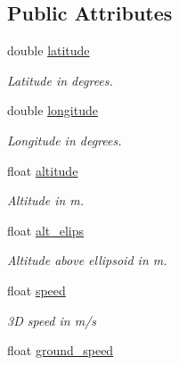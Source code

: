 \subsection*{Public Attributes}
\begin{DoxyCompactItemize}
\item 
double \hyperlink{structgps__t_af54fe11cbde7878a0727616f24dd8fc7}{latitude}
\begin{DoxyCompactList}\small\item\em Latitude in degrees. \end{DoxyCompactList}\item 
double \hyperlink{structgps__t_ad705360e2144f17add716374c5d0395f}{longitude}
\begin{DoxyCompactList}\small\item\em Longitude in degrees. \end{DoxyCompactList}\item 
float \hyperlink{structgps__t_a72edc614dd84ab0d29c6720d15d79e8e}{altitude}
\begin{DoxyCompactList}\small\item\em Altitude in m. \end{DoxyCompactList}\item 
float \hyperlink{structgps__t_a7ce84b87b2d3cbc7d6458e3734cc78e6}{alt\+\_\+elips}
\begin{DoxyCompactList}\small\item\em Altitude above ellipsoid in m. \end{DoxyCompactList}\item 
\hypertarget{structgps__t_a2300eed2c84ab00718f31350f87daa44}{float \hyperlink{structgps__t_a2300eed2c84ab00718f31350f87daa44}{speed}}\label{structgps__t_a2300eed2c84ab00718f31350f87daa44}

\begin{DoxyCompactList}\small\item\em 3\+D speed in m/s \end{DoxyCompactList}\item 
\hypertarget{structgps__t_af27678536c3e3c2ef30d5775d6b291d9}{float \hyperlink{structgps__t_af27678536c3e3c2ef30d5775d6b291d9}{ground\+\_\+speed}}\label{structgps__t_af27678536c3e3c2ef30d5775d6b291d9}


\end{DoxyCompactItemize}
